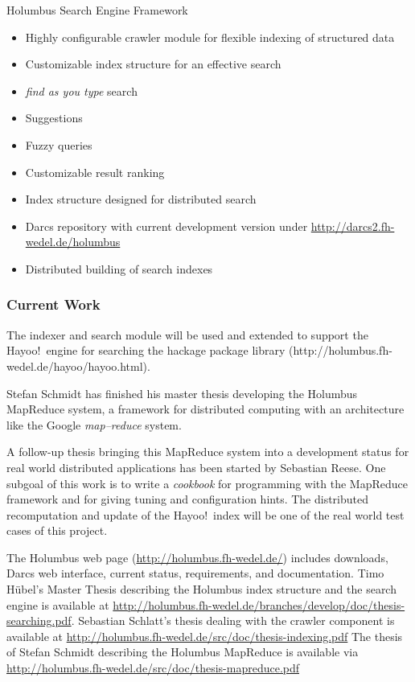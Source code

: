 \begin{hcarentry}[updated]{Holumbus Search Engine Framework}
\begin{itemize}
\item Highly configurable crawler module for flexible indexing of structured data
\item Customizable index structure for an effective search
\item {\em find as you type} search
\item Suggestions
\item Fuzzy queries
\item Customizable result ranking
\item Index structure designed for distributed search
\item Darcs repository with current development version under
  \url{http://darcs2.fh-wedel.de/holumbus}
\item Distributed building of search indexes
\end{itemize}

\subsubsection*{Current Work}

The indexer and search module will be used and extended
to support the Hayoo!\ engine for searching the hackage package library
(http://holumbus.fh-wedel.de/hayoo/hayoo.html).

Stefan Schmidt has finished his master thesis developing
the Holumbus MapReduce system,  a
framework for distributed computing with an architecture
like the Google
{\em map--reduce} system.

A follow-up thesis bringing this
MapReduce system into a development status for real world
distributed applications has been started by Sebastian Reese.
One subgoal of this work is to write a {\em cookbook}
for programming with the MapReduce framework and for giving
tuning and configuration hints.
The distributed recomputation and update of the Hayoo!\ index will
be one of the real world test cases of this project.

\FurtherReading

The Holumbus web page
(\url{http://holumbus.fh-wedel.de/})
includes downloads, Darcs web interface, current status, requirements, 
and documentation.
Timo H\"ubel's Master Thesis describing the Holumbus index structure and
the search engine is available at
\url{http://holumbus.fh-wedel.de/branches/develop/doc/thesis-searching.pdf}.
Sebastian Schlatt's thesis dealing with the crawler component is
available at
\url{http://holumbus.fh-wedel.de/src/doc/thesis-indexing.pdf}
The thesis of Stefan Schmidt describing the Holumbus MapReduce is
available via \url{http://holumbus.fh-wedel.de/src/doc/thesis-mapreduce.pdf}
\end{hcarentry}
